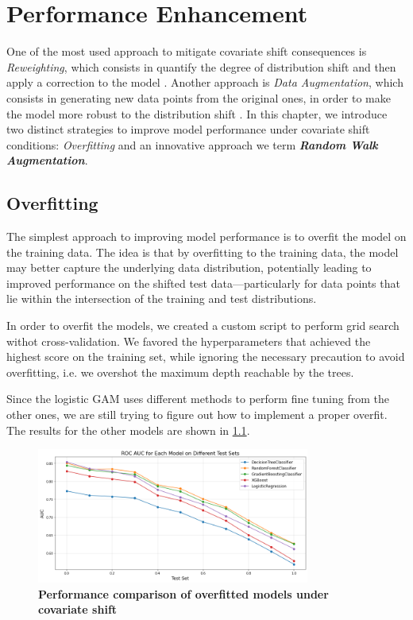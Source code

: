 \chapter{Performance Enhancement}

One of the most used approach to mitigate covariate shift consequences is \textit{Reweighting}, which consists in quantify the degree of distribution shift and then apply a correction to the model \cite{zhang}. Another approach is \textit{Data Augmentation}, which consists in generating new data points from the original ones, in order to make the model more robust to the distribution shift \cite{zhao}. In this chapter, we introduce two distinct strategies to improve model performance under covariate shift conditions: \textit{Overfitting} and an innovative approach we term \textbf{\textit{Random Walk Augmentation}}.

\section{Overfitting}

The simplest approach to improving model performance is to overfit the model on the training data. The idea is that by overfitting to the training data, the model may better capture the underlying data distribution, potentially leading to improved performance on the shifted test data—particularly for data points that lie within the intersection of the training and test distributions.

In order to overfit the models, we created a custom script to perform grid search withot cross-validation. We favored the hyperparameters that achieved the highest score on the training set, while ignoring the necessary precaution to avoid overfitting, i.e. we overshot the maximum depth reachable by the trees.

Since the logistic GAM uses different methods to perform fine tuning from the other ones, we are still trying to figure out how to implement a proper overfit. The results for the other models are shown in \cref{fig:overfitted-models-perf}.

\begin{figure}[H]
    \centering
    \includegraphics[width=0.8\textwidth]{assets/overfit.png} 
    \caption{\textbf{Performance comparison of overfitted models under covariate shift}}
    \label{fig:overfitted-models-perf}
\end{figure}


